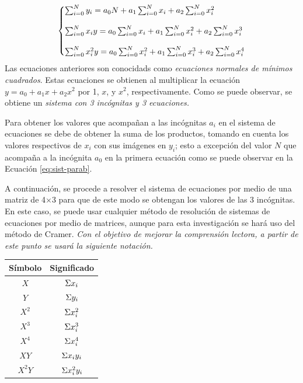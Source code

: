 \documentclass[11pt,letterpaper]{article}
\begin{document}
\begin{equation} \label{eq:sist-parab} 
	\left\{
		\begin{array}{@{}l@{}}
			\sum_{i=0}^{N} y_i  = a_0N + a_1\sum_{i=0}^{N} x_i + a_2\sum_{i=0}^{N} x_i^2 \cr\cr
			\sum_{i=0}^{N} x_iy = a_0\sum_{i=0}^{N} x_i + a_1\sum_{i=0}^{N} x_i^2 + a_2\sum_{i=0}^{N} x_i^3 \cr\cr
			\sum_{i=0}^{N} x_i^2y = a_0\sum_{i=0}^{N} x_i^2 + a_1\sum_{i=0}^{N} x_i^3 + a_2\sum_{i=0}^{N} x_i^4 		
		\end{array}
	\right.
\end{equation}
\linebreak 
Las ecuaciones anteriores  son conocidads como \textit{ecuaciones normales de mínimos cuadrados}. Estas ecuaciones se obtienen al multiplicar la ecuación $y = a_0 + a_1 x + a_2 x^2  $ por  1, $x$, y $x^2$, respectivamente. Como se puede observar, se obtiene un \emph{sistema con 3 incógnitas y 3 ecuaciones.}
\par
Para obtener los valores que acompañan a las incógnitas $a_i$ en el sistema de ecuaciones se debe de obtener la suma de los productos, tomando en cuenta los valores respectivos de $x_i$ con sus imágenes en $y_i$; esto a excepción del valor $N$ que acompaña a la incógnita $a_0$ en la primera ecuación como se puede observar en la Ecuación \ref{eq:sist-parab}.
\par
A continuación, se procede a resolver el sistema de ecuaciones por medio de una matriz de 4$\times$3 para que de este modo se obtengan los valores de las 3 incógnitas. \cite{spiegel}\cite{nieves2011metodos} En este caso, se puede usar cualquier método de resolución de sistemas de ecuaciones por medio de matrices, aunque para esta investigación se hará uso del método de Cramer. \emph{ Con el objetivo de mejorar la comprensión lectora, a partir de este punto se usará la siguiente notación.}

 \begin{table}[H]
 \centering
	\begin{tabular}{ c | c }
	\hline
	Símbolo & Significado  \\ \hline
	$X$ &	$\mathlarger{\Sigma} x_i$  \\ 
	$Y$ &   $\mathlarger{\Sigma} y_i$ \\
	$X^2$ & $\mathlarger{\Sigma} x_i^2$ \\
	$X^3$ & $\mathlarger{\Sigma }x_i^3$ \\ 
	$X^4$ & $\mathlarger{\Sigma} x_i^4$ \\
	$XY$ &  $\mathlarger{\Sigma} x_i y_i$	\\
	$X^2Y$& $\mathlarger{\Sigma} x^2_i y_i$	\\ \hline
	\end{tabular}
	\label{table:simbologia}
\end{table}
\end{document}
